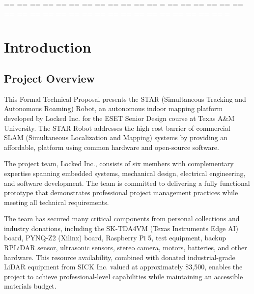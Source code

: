     == == == == == == == == == == == ==
    = %
      == == == == == == == == == == == == == == == == == == == == == == ==
    =

\section {
  Introduction
}
\label {
sec:
  introduction
}

\subsection { Project Overview }\label{sec:project-overview}

This Formal Technical Proposal presents the STAR (Simultaneous Tracking and Autonomous Roaming) Robot, an autonomous indoor mapping platform developed by Locked Inc. for the ESET Senior Design course at Texas A\&M University. The STAR Robot addresses the high cost barrier of commercial SLAM (Simultaneous Localization and Mapping) systems by providing an affordable,  platform using common hardware and open-source software.

The project team, Locked Inc., consists of six members with complementary expertise spanning embedded systems, mechanical design, electrical engineering, and software development. The team is committed to delivering a fully functional prototype that demonstrates professional project management practices while meeting all technical requirements.

The team has secured many critical components from personal collections and industry donations, including the SK-TDA4VM (Texas Instruments Edge AI) board, PYNQ-Z2 (Xilinx) board, Raspberry Pi 5, test equipment, backup RPLiDAR sensor, ultrasonic sensors, stereo camera, motors, batteries, and other hardware. This resource availability, combined with donated industrial-grade LiDAR equipment from SICK Inc. valued at approximately \$3,500, enables the project to achieve professional-level capabilities while maintaining an accessible materials budget.

